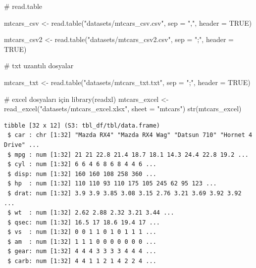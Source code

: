 \documentclass[
  letterpaper,
  DIV=11,
  numbers=noendperiod]{scrreprt}
\newenvironment{Shaded}{\begin{snugshade}}{\end{snugshade}}
\newcommand{\AttributeTok}[1]{\textcolor[rgb]{0.40,0.45,0.13}{#1}}
\newcommand{\CommentTok}[1]{\textcolor[rgb]{0.37,0.37,0.37}{#1}}
\newcommand{\ConstantTok}[1]{\textcolor[rgb]{0.56,0.35,0.01}{#1}}
\newcommand{\FunctionTok}[1]{\textcolor[rgb]{0.28,0.35,0.67}{#1}}
\newcommand{\NormalTok}[1]{\textcolor[rgb]{0.00,0.23,0.31}{#1}}
\newcommand{\OtherTok}[1]{\textcolor[rgb]{0.00,0.23,0.31}{#1}}
\newcommand{\StringTok}[1]{\textcolor[rgb]{0.13,0.47,0.30}{#1}}
\begin{document}
\begin{Shaded}
\begin{Highlighting}[]
\CommentTok{\# read.table}

\NormalTok{mtcars\_csv }\OtherTok{\textless{}{-}} \FunctionTok{read.table}\NormalTok{(}\StringTok{"datasets/mtcars\_csv.csv"}\NormalTok{,}
                         \AttributeTok{sep =} \StringTok{","}\NormalTok{,}
                         \AttributeTok{header =} \ConstantTok{TRUE}\NormalTok{)}

\NormalTok{mtcars\_csv2 }\OtherTok{\textless{}{-}} \FunctionTok{read.table}\NormalTok{(}\StringTok{"datasets/mtcars\_csv2.csv"}\NormalTok{,}
                          \AttributeTok{sep =} \StringTok{";"}\NormalTok{,}
                          \AttributeTok{header =} \ConstantTok{TRUE}\NormalTok{)}

\CommentTok{\# txt uzantılı dosyalar}

\NormalTok{mtcars\_txt }\OtherTok{\textless{}{-}} \FunctionTok{read.table}\NormalTok{(}\StringTok{"datasets/mtcars\_txt.txt"}\NormalTok{,}
                          \AttributeTok{sep =} \StringTok{";"}\NormalTok{,}
                          \AttributeTok{header =} \ConstantTok{TRUE}\NormalTok{)}

\CommentTok{\# excel dosyaları için}
\FunctionTok{library}\NormalTok{(readxl)}
\NormalTok{mtcars\_excel }\OtherTok{\textless{}{-}} \FunctionTok{read\_excel}\NormalTok{(}\StringTok{"datasets/mtcars\_excel.xlsx"}\NormalTok{,}
                           \AttributeTok{sheet =} \StringTok{"mtcars"}\NormalTok{)}
\FunctionTok{str}\NormalTok{(mtcars\_excel)}
\end{Highlighting}
\end{Shaded}

\begin{verbatim}
tibble [32 x 12] (S3: tbl_df/tbl/data.frame)
 $ car : chr [1:32] "Mazda RX4" "Mazda RX4 Wag" "Datsun 710" "Hornet 4 Drive" ...
 $ mpg : num [1:32] 21 21 22.8 21.4 18.7 18.1 14.3 24.4 22.8 19.2 ...
 $ cyl : num [1:32] 6 6 4 6 8 6 8 4 4 6 ...
 $ disp: num [1:32] 160 160 108 258 360 ...
 $ hp  : num [1:32] 110 110 93 110 175 105 245 62 95 123 ...
 $ drat: num [1:32] 3.9 3.9 3.85 3.08 3.15 2.76 3.21 3.69 3.92 3.92 ...
 $ wt  : num [1:32] 2.62 2.88 2.32 3.21 3.44 ...
 $ qsec: num [1:32] 16.5 17 18.6 19.4 17 ...
 $ vs  : num [1:32] 0 0 1 1 0 1 0 1 1 1 ...
 $ am  : num [1:32] 1 1 1 0 0 0 0 0 0 0 ...
 $ gear: num [1:32] 4 4 4 3 3 3 3 4 4 4 ...
 $ carb: num [1:32] 4 4 1 1 2 1 4 2 2 4 ...
\end{verbatim}
\end{document}
